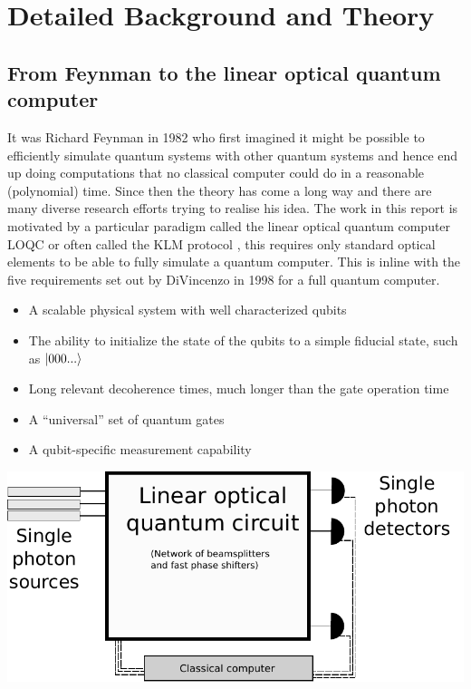 \newpage
\section{Detailed Background and Theory}
\subsection{From Feynman to the linear optical quantum computer}
It was Richard Feynman in 1982 who first imagined it might be possible to efficiently simulate quantum systems with other quantum systems and hence end up doing computations that no classical computer could do in a reasonable (polynomial) time. Since then the theory has come a long way and there are many diverse research efforts trying to realise his idea. The work in this report is motivated by a particular paradigm called the linear optical quantum computer LOQC or often called the KLM protocol \cite{knill_efficient_2000}, this requires only standard optical elements to be able to fully simulate a quantum computer. This is inline with the five requirements set out by DiVincenzo in 1998 \cite{divincenzo_quantum_1998} for a full quantum computer.
\begin{itemize}
	\item A scalable physical system with well characterized
qubits
	\item The ability to initialize the state of the qubits to a
simple fiducial state, such as $\ket{000...}$
	\item Long relevant decoherence times, much longer than
the gate operation time
	\item A “universal” set of quantum gates
	\item A qubit-specific measurement capability
\end{itemize}



\begingroup
    \centering  
    \includegraphics[width=18cm]{img/theory/loqc.pdf}
     \vspace{3pt} \label{loqc}
\endgroup



